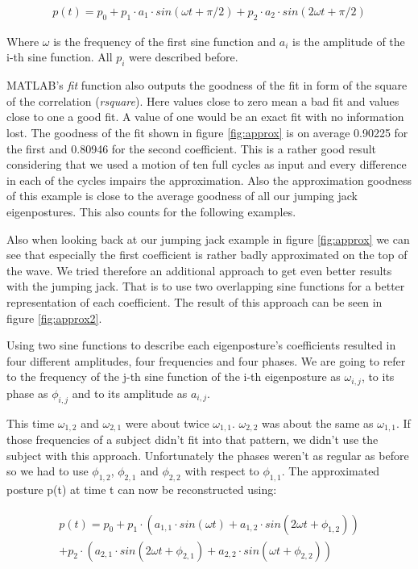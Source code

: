 \documentclass[a4paper]{article}
\begin{document}
\begin{align}
	p(t) = p_{0} + p_{1} \cdot a_{1} \cdot sin(\omega t + \pi/2) + p_{2} \cdot a_{2} \cdot sin(2 \omega t + \pi/2) \label{eq:approxPostureSin}
\end{align}

Where $\omega$ is the frequency of the first sine function and $a_{i}$ is the amplitude of the i-th sine function. All $p_{i}$ were described before.

MATLAB's \emph{fit} function also outputs the goodness of the fit in form of the square of the correlation (\emph{rsquare}).
Here values close to zero mean a bad fit and values close to one a good fit.
A value of one would be an exact fit with no information lost.
The goodness of the fit shown in figure \ref{fig:approx} is on average 0.90225 for the first and 0.80946 for the second coefficient.
This is a rather good result considering that we used a motion of ten full cycles as input and every difference in each of the cycles impairs the approximation.
Also the approximation goodness of this example is close to the average goodness of all our jumping jack eigenpostures.
This also counts for the following examples.

Also when looking back at our jumping jack example in figure \ref{fig:approx} we can see that especially the first coefficient is rather badly approximated on the top of the wave.
We tried therefore an additional approach to get even better results with the jumping jack.
That is to use two overlapping sine functions for a better representation of each coefficient.
The result of this approach can be seen in figure \ref{fig:approx2}.

Using two sine functions to describe each eigenposture's coefficients resulted in four different amplitudes, four frequencies and four phases.
We are going to refer to the frequency of the j-th sine function of the i-th eigenposture as $\omega_{i,j}$, to its phase as $\phi_{i,j}$ and to its amplitude as $a_{i,j}$.

This time $\omega_{1,2}$ and $\omega_{2,1}$ were about twice $\omega_{1,1}$.
$\omega_{2,2}$ was about the same as $\omega_{1,1}$.
If those frequencies of a subject didn't fit into that pattern, we didn't use the subject with this approach.
Unfortunately the phases weren't as regular as before so we had to use $\phi_{1,2}$, $\phi_{2,1}$ and $\phi_{2,2}$ with respect to $\phi_{1,1}$.
The approximated posture p(t) at time t can now be reconstructed using:

\begin{align}
	\begin{aligned}
		p(t) = p_{0} + p_{1} \cdot (a_{1,1} \cdot sin(\omega t) + a_{1,2} \cdot sin(2 \omega t + \phi_{1,2})) \\
		 + p_{2} \cdot (a_{2,1} \cdot sin(2 \omega t + \phi_{2,1}) + a_{2,2} \cdot sin(\omega t + \phi_{2,2}))
	\end{aligned}
	\label{eq:approxPostureSin2}
\end{align}
\end{document}
